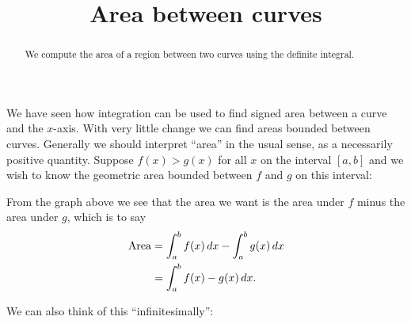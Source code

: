 \documentclass[handout]{ximera}
\title{Area between curves}
\begin{document}
\begin{abstract}
  We compute the area of a region between two curves using the
  definite integral.
\end{abstract}
\maketitle


We have seen how integration can be used to find signed area between a
curve and the $x$-axis. With very little change we can find areas
bounded between curves.  Generally we should interpret ``area'' in the
usual sense, as a necessarily positive quantity. Suppose $f(x)>g(x)$
for all $x$ on the interval $[a,b]$ and we wish to know the geometric
area bounded between $f$ and $g$ on this interval:
\begin{image}
\end{image}
From the graph above we see that the area we want is the area under
$f$ minus the area under $g$, which is to say
\begin{align*}
\mathrm{Area} &= \int_a^b f(x)\mathop{}\!d x-\int_a^b g(x)\mathop{}\!d x \\
&= \int_a^b f(x)-g(x) \mathop{}\!d x.
\end{align*}

We can also think of this ``infinitesimally'':
\end{document}
